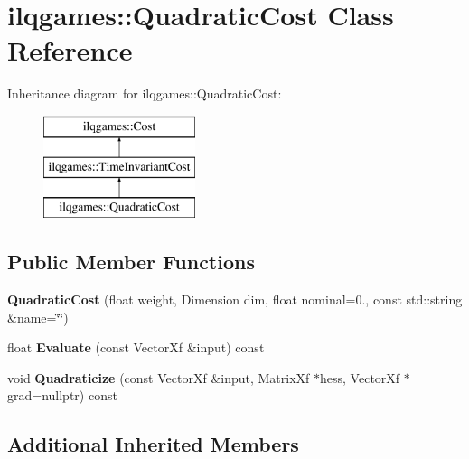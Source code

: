 \hypertarget{classilqgames_1_1_quadratic_cost}{}\section{ilqgames\+:\+:Quadratic\+Cost Class Reference}
\label{classilqgames_1_1_quadratic_cost}
Inheritance diagram for ilqgames\+:\+:Quadratic\+Cost\+:\begin{figure}[H]
\begin{center}
\leavevmode
\includegraphics[height=3.000000cm]{classilqgames_1_1_quadratic_cost}
\end{center}
\end{figure}
\subsection*{Public Member Functions}
\begin{DoxyCompactItemize}
\item 
{\bfseries Quadratic\+Cost} (float weight, Dimension dim, float nominal=0., const std\+::string \&name=\char`\"{}\char`\"{})\hypertarget{classilqgames_1_1_quadratic_cost_a808c59c5dc19b77da62a8463f38cf4b1}{}\label{classilqgames_1_1_quadratic_cost_a808c59c5dc19b77da62a8463f38cf4b1}

\item 
float {\bfseries Evaluate} (const Vector\+Xf \&input) const \hypertarget{classilqgames_1_1_quadratic_cost_a2f1b56afdb011f212e7958e43f5601bc}{}\label{classilqgames_1_1_quadratic_cost_a2f1b56afdb011f212e7958e43f5601bc}

\item 
void {\bfseries Quadraticize} (const Vector\+Xf \&input, Matrix\+Xf $\ast$hess, Vector\+Xf $\ast$grad=nullptr) const \hypertarget{classilqgames_1_1_quadratic_cost_ab7c1fb3604e8b2b60efb53367f006834}{}\label{classilqgames_1_1_quadratic_cost_ab7c1fb3604e8b2b60efb53367f006834}

\end{DoxyCompactItemize}
\subsection*{Additional Inherited Members}


